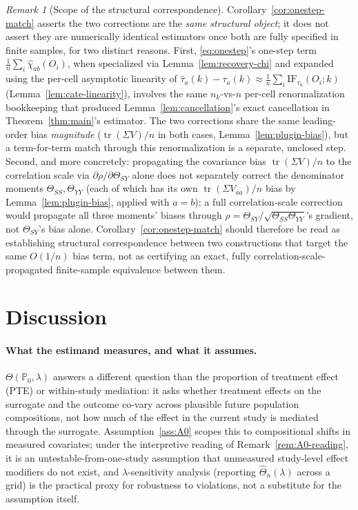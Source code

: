 \documentclass[11pt]{article}
\theoremstyle{plain}
\theoremstyle{definition}
\theoremstyle{remark}
\newtheorem{remark}[theorem]{Remark}
\newcommand{\PP}{\mathbb{P}}
\newcommand{\IF}{\mathrm{IF}}
\DeclareMathOperator{\tr}{tr}
\begin{document}
\begin{remark}[Scope of the structural correspondence]\label{rem:onestep-scope}
Corollary~\ref{cor:onestep-match} asserts the two corrections are the \emph{same
structural object}; it does not assert they are numerically identical estimators
once both are fully specified in finite samples, for two distinct reasons. First,
\eqref{eq:onestep}'s one-step term $\frac1n\sum_i\hat\chi_{ab}(O_i)$, when specialized
via Lemma~\ref{lem:recovery-chi} and expanded using the per-cell asymptotic linearity
of $\hat\tau_a(k)-\tau_a(k)\approx\frac1n\sum_i\IF_{\tau_a}(O_i;k)$
(Lemma~\ref{lem:cate-linearity}), involves the same $n_k$-vs-$n$ per-cell
renormalization bookkeeping that produced Lemma~\ref{lem:cancellation}'s exact
cancellation in Theorem~\ref{thm:main}'s estimator. The two corrections share the
same leading-order bias \emph{magnitude} ($\tr(\Sigma V)/n$ in both cases,
Lemma~\ref{lem:plugin-bias}), but a term-for-term match through this renormalization
is a separate, unclosed step. Second, and more concretely: propagating the
covariance bias $\tr(\Sigma V)/n$ to the correlation scale via
$\partial\rho/\partial\Theta_{SY}$ alone does not separately correct the
denominator moments $\Theta_{SS},\Theta_{YY}$ (each of which has its own
$\tr(\Sigma V_{aa})/n$ bias by Lemma~\ref{lem:plugin-bias}, applied with $a=b$); a
full correlation-scale correction would propagate all three moments' biases through
$\rho=\Theta_{SY}/\sqrt{\Theta_{SS}\Theta_{YY}}$'s gradient, not $\Theta_{SY}$'s bias
alone. Corollary~\ref{cor:onestep-match} should therefore be read as establishing
structural correspondence between two constructions that target the same $O(1/n)$
bias term, not as certifying an exact, fully correlation-scale-propagated
finite-sample equivalence between them.
\end{remark}

\section{Discussion}\label{sec:discussion}

\paragraph{What the estimand measures, and what it assumes.} $\Theta(\PP_0,\lambda)$
answers a different question than the proportion of treatment effect (PTE) or
within-study mediation: it asks whether treatment effects on the surrogate and the
outcome co-vary across plausible future population compositions, not how much of the
effect in the current study is mediated through the surrogate. Assumption~\ref{ass:A0}
scopes this to compositional shifts in measured covariates; under the interpretive
reading of Remark~\ref{rem:A0-reading}, it is an untestable-from-one-study assumption
that unmeasured study-level effect modifiers do not exist, and $\lambda$-sensitivity
analysis (reporting $\hat\Theta_n(\lambda)$ across a grid) is the practical proxy for
robustness to violations, not a substitute for the assumption itself.
\end{document}
